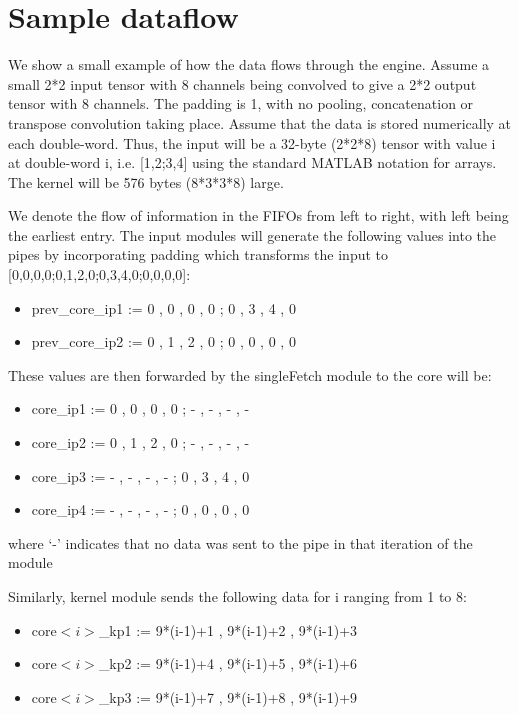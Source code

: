 \documentclass[a4paper,12pt, final]{report}
\begin{document}
\section{Sample dataflow}

We show a small example of how the data flows through the engine. Assume a small 2*2 input tensor with 8 channels being convolved to give a 2*2 output tensor with 8 channels. The padding is 1, with no pooling, concatenation or transpose convolution taking place. Assume that the data is stored numerically at each double-word. Thus, the input will be a 32-byte (2*2*8) tensor with value i at double-word i, i.e. [1,2;3,4] using the standard MATLAB notation for arrays. The kernel will be 576 bytes (8*3*3*8) large.

We denote the flow of information in the FIFOs from left to right, with left being the earliest entry. The input modules will generate the following values into the pipes by incorporating padding which transforms the input to [0,0,0,0;0,1,2,0;0,3,4,0;0,0,0,0]:

\begin{itemize}
	\item prev\_core\_ip1 := 0 , 0 , 0 , 0 ; 0 , 3 , 4 , 0
	\item prev\_core\_ip2 := 0 , 1 , 2 , 0 ; 0 , 0 , 0 , 0
\end{itemize}

These values are then forwarded by the singleFetch module to the core will be:

\begin{itemize}
	\item core\_ip1 := 0 , 0 , 0 , 0 ; - , - , - , -
	\item core\_ip2 := 0 , 1 , 2 , 0 ; - , - , - , -
	\item core\_ip3 := - , - , - , - ; 0 , 3 , 4 , 0
	\item core\_ip4 := - , - , - , - ; 0 , 0 , 0 , 0
\end{itemize}
where `-' indicates that no data was sent to the pipe in that iteration of the module

Similarly, kernel module sends the following data for i ranging from 1 to 8:

\begin{itemize}
	\item core$<i>$\_kp1 := 9*(i-1)+1 , 9*(i-1)+2 , 9*(i-1)+3
	\item core$<i>$\_kp2 := 9*(i-1)+4 , 9*(i-1)+5 , 9*(i-1)+6
	\item core$<i>$\_kp3 := 9*(i-1)+7 , 9*(i-1)+8 , 9*(i-1)+9
\end{itemize}
\end{document}

